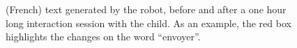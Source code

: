 \documentclass[10pt,a4paper]{article}
\begin{document}
\begin{figure}
    \centering

    \caption{\small (French) text generated by the robot, before and after a one
        hour long interaction session with the child. As an example, the red box
        highlights the changes on the word ``envoyer''.}

    \label{fig:stimuli}
\end{figure}
\end{document}
